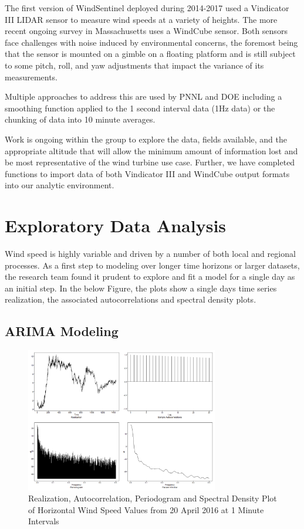 \documentclass{llncs}
\begin{document}
The first version of WindSentinel deployed during 2014-2017 used a Vindicator III LIDAR sensor to measure wind speeds at a variety of heights. The more recent ongoing survey in Massachusetts uses a WindCube sensor. Both sensors face challenges with noise induced by environmental concerns, the foremost being that the sensor is mounted on a gimble on a floating platform and is still subject to some pitch, roll, and yaw adjustments that impact the variance of its measurements.

Multiple approaches to address this are used by PNNL and DOE including a smoothing function applied to the 1 second interval data (1Hz data) or the chunking of data into 10 minute averages.

Work is ongoing within the group to explore the data, fields available, and the appropriate altitude that will allow the minimum amount of information lost and be most representative of the wind turbine use case. Further, we have completed functions to import data of both Vindicator III and WindCube output formats into our analytic environment.

\section{Exploratory Data Analysis} Wind speed is highly variable and driven by a number of both local and regional processes. As a first step to modeling over longer time horizons or larger datasets, the research team found it prudent to explore and fit a model for a single day as an initial step. In the below Figure, the plots show a single days time series realization, the associated autocorrelations and spectral density plots.

\subsection{ARIMA Modeling}
\begin{figure}
  \centering
  \includegraphics[width=0.75\textwidth]{apr_20_plot.png}
  \caption{Realization, Autocorrelation, Periodogram and Spectral Density Plot of Horizontal Wind Speed Values from 20 April 2016 at 1 Minute Intervals}
  \label{fig:Apr20Plot}
\end{figure}
\end{document}
